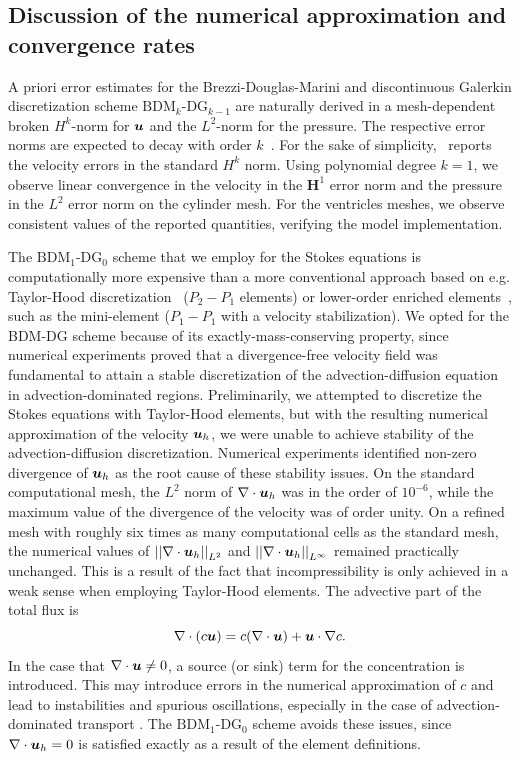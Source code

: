\documentclass{WileyMSP-template}
\begin{document}
\subsection{Discussion of the numerical approximation and convergence rates}
A priori error estimates for the
Brezzi-Douglas-Marini and discontinuous Galerkin discretization scheme
$\mathrm{BDM}_k$-$\mathrm{DG}_{k-1}$ are naturally 
derived in a mesh-dependent broken $H^k$-norm for $\bm{u}$ and the $L^2$-norm for the pressure.
The respective error norms are expected to decay with order $k$~\cite{Cockburn2005AEquations}.
For the sake of simplicity,~
reports the velocity errors in the standard $H^k$ norm. Using polynomial degree  
$k=1$, we observe linear convergence in the velocity in the $\mathbf{H}^1$ error norm
and the pressure in the $L^2$ error norm on the cylinder mesh. For the ventricles meshes,
we observe consistent values of the reported quantities, verifying the model
implementation.

The $\mathrm{BDM}_1$-$\mathrm{DG}_0$ scheme that we employ for the Stokes equations
is computationally more expensive than a more conventional approach based on
e.g. Taylor-Hood discretization~\cite{Stenberg1990ErrorProblem}
($P_2-P_1$ elements) or lower-order enriched
elements~\cite{Brezzi2011MixedMethods},
such as the mini-element ($P_1-P_1$ with a velocity stabilization).
We opted for the BDM-DG scheme because of its exactly-mass-conserving property,
since numerical experiments proved that a divergence-free velocity field was
fundamental to attain a stable discretization of the advection-diffusion equation
in advection-dominated regions. Preliminarily, we attempted
to discretize the Stokes equations with 
Taylor-Hood elements, but with the resulting numerical approximation
of the velocity $\bm{u}_h$, we were unable to achieve
stability of the advection-diffusion discretization.
Numerical experiments identified non-zero divergence of $\bm{u}_h$
as the root cause of these stability issues.
On the standard computational mesh, the $L^2$ norm of $\nabla\cdot\bm{u}_h$ was
in the order of $10^{-6}$, while the
maximum value of the divergence of the velocity was of order unity.
On a refined mesh with roughly six times as many
computational cells as the standard mesh, the numerical values of
${ \vert\vert\nabla\cdot\bm{u}_h\vert\vert}_{L^2}$ and ${\vert\vert\nabla\cdot\bm{u}_h\vert\vert}_{L^{\infty}}$
remained practically unchanged. This is a result
of the fact that incompressibility is only achieved in a weak sense when
employing Taylor-Hood elements. The advective part of the total flux
is
\begin{equation*}
    \nabla\cdot(c\bm{u}) = c(\nabla\cdot\bm{u}) + \bm{u}\cdot\nabla c.
\end{equation*}
In the case that $\nabla\cdot\bm{u}\neq 0$, a source (or sink) term for the concentration
is introduced. This may introduce errors in the numerical approximation of $c$
and lead to instabilities and spurious oscillations, especially in the case of
advection-dominated transport
\cite{gresho1998incompressible, cesmelioglu2022compatible, johnson2009numerical}.
The $\mathrm{BDM}_1$-$\mathrm{DG}_0$ scheme avoids these issues,
since $\nabla\cdot\bm{u}_h=0$ is satisfied exactly as a result of the element definitions.
\end{document}

